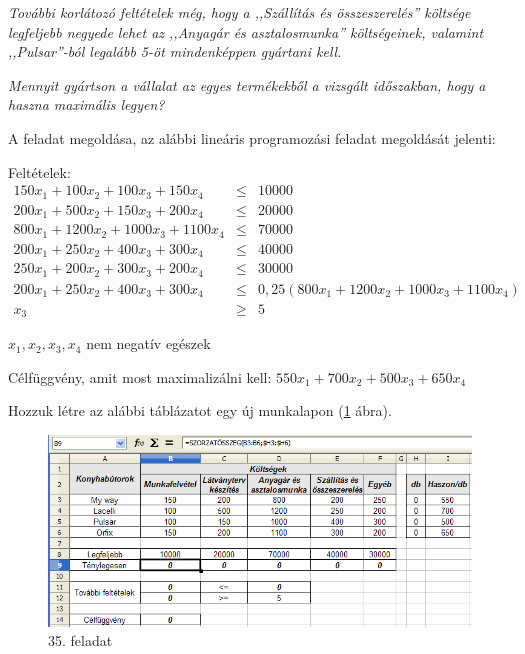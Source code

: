 {\itshape
További korlátozó feltételek még, hogy a ,,Szállítás és
összeszerelés'' költsége legfeljebb negyede lehet az ,,Anyagár és
asztalosmunka'' költségeinek, valamint ,,Pulsar''-ból legalább 5-öt
mindenképpen gyártani kell.}

{\itshape
Mennyit gyártson a vállalat az egyes termékekből a vizsgált
időszakban, hogy a haszna maximális legyen?}

\clearpage
A feladat megoldása, az alábbi lineáris programozási feladat
megoldását jelenti:

Feltételek:
\begin{eqnarray*}
150x_1+100x_2+100x_3+150x_4&\leqslant &10000\\
200x_1+500x_2+150x_3+200x_4&\leqslant &20000\\
800x_1+1200x_2+1000x_3+1100x_4&\leqslant &70000\\
200x_1+250x_2+400x_3+300x_4&\leqslant &40000\\
250x_1+200x_2+300x_3+200x_4&\leqslant &30000\\
200x_1+250x_2+400x_3+300x_4&\leqslant
&0,25(800x_1+1200x_2+1000x_3+1100x_4)\\
x_{3}&\geqslant &5
\end{eqnarray*}
\begin{center}
$x_{1},x_{2},x_{3},x_{4}$ nem negatív egészek
\end{center}

Célfüggvény, amit most maximalizálni kell:
$550x_{1}+700x_{2}+500x_{3}+650x_{4}$

Hozzuk létre az alábbi táblázatot egy új munkalapon (\ref{35-feladat}
ábra).

\begin{figure}[!h]
\begin{center}
\includegraphics[width=15.999cm]{oocalcv2-img170.png}
\caption{35. feladat}\label{35-feladat}
\end{center}
\end{figure}

